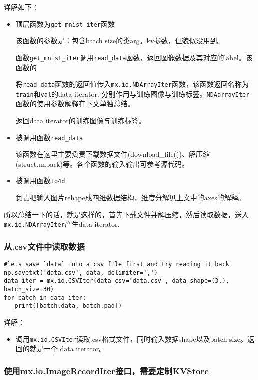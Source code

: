 详解如下：
\begin{itemize}
\item 顶层函数为\verb|get_mnist_iter|函数

该函数的参数是：包含batch size的类arg。kv参数，但貌似没用到。

函数\verb|get_mnist_iter|调用\verb|read_data|函数，返回图像数据及其对应的label。该函数的

将\verb|read_data|函数的返回值传入\verb|mx.io.NDArrayIter|函数，该函数返回名称为\verb|train|和\verb|val|的data iterator. 分别作用与训练图像与训练标签。\verb|NDAarrayIter|函数的使用参数解释在下文单独总结。

返回data iterator的训练图像与训练标签。

\item 被调用函数\verb|read_data|

该函数在这里主要负责下载数据文件(download\_file())、解压缩(struct.unpack)等。各个函数的输入输出可参考源代码。

\item 被调用函数\verb|to4d|

负责把输入图片rehape成四维数据结构，维度分解见上文中的axes的解释。

\end{itemize}

所以总结一下的话，就是这样的，首先下载文件并解压缩，然后读取数据，送入\verb|mx.io.NDArrayIter|产生data iterator.

\subsubsection{从.csv文件中读取数据}

\begin{lstlisting}
#lets save `data` into a csv file first and try reading it back
np.savetxt('data.csv', data, delimiter=',')
data_iter = mx.io.CSVIter(data_csv='data.csv', data_shape=(3,), batch_size=30)
for batch in data_iter:
   print([batch.data, batch.pad])
\end{lstlisting}

详解：
\begin{itemize}
\item 调用\verb|mx.io.CSVIter|读取.csv格式文件，同时输入数据shape以及batch size。返回的就是一个 data iterator。
\end{itemize}

\subsubsection{使用mx.io.ImageRecordIter接口，需要定制KVStore}

